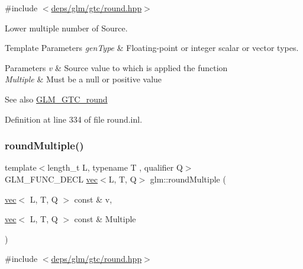 {\ttfamily \#include $<$\hyperlink{round_8hpp}{deps/glm/gtc/round.\+hpp}$>$}

Lower multiple number of Source.


\begin{DoxyTemplParams}{Template Parameters}
{\em gen\+Type} & Floating-\/point or integer scalar or vector types.\\
\hline
\end{DoxyTemplParams}

\begin{DoxyParams}{Parameters}
{\em v} & Source value to which is applied the function \\
\hline
{\em Multiple} & Must be a null or positive value\\
\hline
\end{DoxyParams}
\begin{DoxySeeAlso}{See also}
\hyperlink{group__gtc__round}{G\+L\+M\+\_\+\+G\+T\+C\+\_\+round} 
\end{DoxySeeAlso}


Definition at line 334 of file round.\+inl.

\mbox{\label{group__gtc__round_ga2f1a68332d761804c054460a612e3a4b}} 
\subsubsection{\texorpdfstring{round\+Multiple()}{roundMultiple()}\hspace{0.1cm}{\footnotesize\ttfamily [2/2]}}
{\footnotesize\ttfamily template$<$length\+\_\+t L, typename T , qualifier Q$>$ \\
G\+L\+M\+\_\+\+F\+U\+N\+C\+\_\+\+D\+E\+CL \hyperlink{structglm_1_1vec}{vec}$<$L, T, Q$>$ glm\+::round\+Multiple (\begin{DoxyParamCaption}\item[{\hyperlink{structglm_1_1vec}{vec}$<$ L, T, Q $>$ const \&}]{v,  }\item[{\hyperlink{structglm_1_1vec}{vec}$<$ L, T, Q $>$ const \&}]{Multiple }\end{DoxyParamCaption})}



{\ttfamily \#include $<$\hyperlink{round_8hpp}{deps/glm/gtc/round.\+hpp}$>$}

